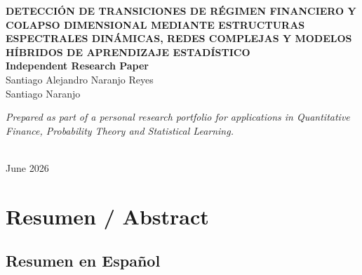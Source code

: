 \documentclass[
  12pt,
]{article}
\author{}
\date{}
\begin{document}
\begin{titlepage}
  \begin{center}
    \vspace*{3cm}
    
    {\Large\bfseries DETECCIÓN DE TRANSICIONES DE RÉGIMEN FINANCIERO Y COLAPSO DIMENSIONAL MEDIANTE ESTRUCTURAS ESPECTRALES DINÁMICAS, REDES COMPLEJAS Y MODELOS HÍBRIDOS DE APRENDIZAJE ESTADÍSTICO}\\[1cm]
    
    {\large\bfseries Independent Research Paper}\\[2cm]
    
    {\large Santiago Alejandro Naranjo Reyes}\\[0.2cm]
    {\large Santiago Naranjo}\\[3cm]
    
    \begin{minipage}{0.8\textwidth}
      \centering
      \itshape Prepared as part of a personal research portfolio for applications in Quantitative Finance, Probability Theory and Statistical Learning.
    \end{minipage}\\[3cm]
    
    \vfill
    {\large June 2026}
  \end{center}
\end{titlepage}


\newpage
\tableofcontents
\newpage

\section{Resumen / Abstract}\label{resumen-abstract}

\subsection{Resumen en Español}\label{resumen-en-espauxf1ol}
\end{document}
